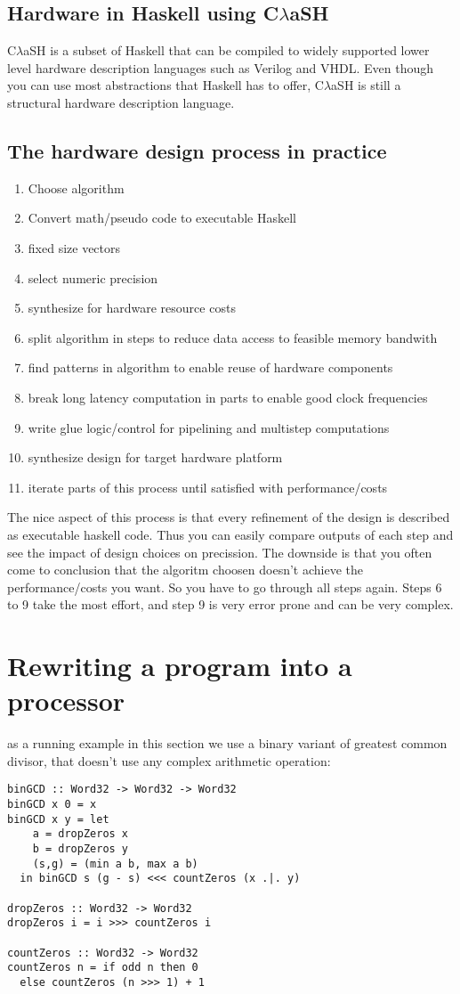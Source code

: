 \documentclass[preprint]{sigplanconf}
\def\clash{C$\lambda$aSH\xspace}
\begin{document}
\subsection{Hardware in Haskell using \clash}
\clash \cite{Baaij} is a subset of Haskell that can be compiled to widely supported lower level hardware description languages such as Verilog and VHDL.
Even though you can use most abstractions that Haskell has to offer, \clash is still a structural hardware description language.

\subsection{The hardware design process in practice}
\begin{enumerate}
 \item Choose algorithm
 \item Convert math/pseudo code to executable Haskell
 \item fixed size vectors
 \item select numeric precision
 \item synthesize for hardware resource costs
 \item split algorithm in steps to reduce data access to feasible memory bandwith
 \item find patterns in algorithm to enable reuse of hardware components
 \item break long latency computation in parts to enable good clock frequencies
 \item write glue logic/control for pipelining and multistep computations
 \item synthesize design for target hardware platform
 \item iterate parts of this process until satisfied with performance/costs
\end{enumerate}
The nice aspect of this process is that every refinement of the design is described as executable haskell code.
Thus you can easily compare outputs of each step and see the impact of design choices on precission.
The downside is that you often come to conclusion that the algoritm choosen doesn't achieve the performance/costs you want. So you have to go through all steps again.
Steps 6 to 9 take the most effort, and step 9 is very error prone and can be very complex.

\section{Rewriting a program into a processor}
as a running example in this section we use a binary variant of greatest common divisor, that doesn't use any complex arithmetic operation:
\begin{lstlisting}
binGCD :: Word32 -> Word32 -> Word32       
binGCD x 0 = x
binGCD x y = let
    a = dropZeros x
    b = dropZeros y
    (s,g) = (min a b, max a b)
  in binGCD s (g - s) <<< countZeros (x .|. y)

dropZeros :: Word32 -> Word32
dropZeros i = i >>> countZeros i

countZeros :: Word32 -> Word32
countZeros n = if odd n then 0 
  else countZeros (n >>> 1) + 1
\end{lstlisting}
\end{document}
